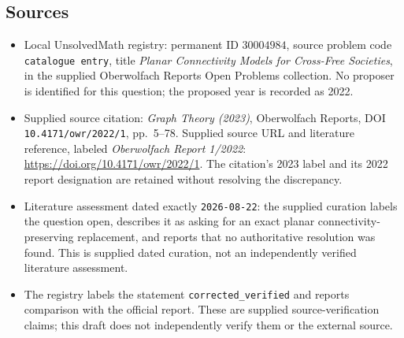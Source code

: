 \documentclass[11pt]{article}
\begin{document}
\subsection{Sources}
\begin{itemize}
\item Local UnsolvedMath registry: permanent ID \(30004984\), source problem code \texttt{catalogue entry}, title \emph{Planar Connectivity Models for Cross-Free Societies}, in the supplied Oberwolfach Reports Open Problems collection. No proposer is identified for this question; the proposed year is recorded as 2022.
\item Supplied source citation: \emph{Graph Theory (2023)}, Oberwolfach Reports, DOI \texttt{10.4171/owr/2022/1}, pp.~5--78. Supplied source URL and literature reference, labeled \emph{Oberwolfach Report 1/2022}: \url{https://doi.org/10.4171/owr/2022/1}. The citation's 2023 label and its 2022 report designation are retained without resolving the discrepancy.
\item Literature assessment dated exactly \texttt{2026-08-22}: the supplied curation labels the question open, describes it as asking for an exact planar connectivity-preserving replacement, and reports that no authoritative resolution was found. This is supplied dated curation, not an independently verified literature assessment.
\item The registry labels the statement \texttt{corrected\_verified} and reports comparison with the official report. These are supplied source-verification claims; this draft does not independently verify them or the external source.
\end{itemize}
\end{document}
